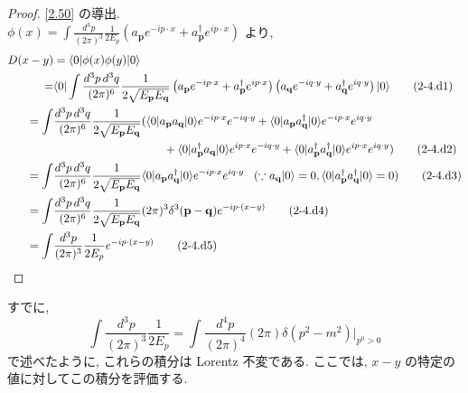 \documentclass[a4paper,12pt]{article}
\begin{document}
\color{blue}
\begin{proof}
\eqref{2.50} の導出.\\
$\displaystyle \phi(x) = \int \frac{d^3 p}{(2\pi)^3} \frac{1}{2E_p} \left( a_{\mathbf{p}} e^{-ip \cdot x} + a_{\mathbf{p}}^\dagger e^{ip \cdot x} \right)$ より,
\begin{align*}
  D(x-y) &= \langle 0 | \phi(x) \phi(y) | 0 \rangle \\
  =& \langle 0 | \int \frac{d^3 p\, d^3 q}{(2\pi)^6} \frac{1}{2\sqrt{E_{\mathbf{p}} E_{\mathbf{q}}}} \left( a_{\mathbf{p}} e^{-ip \cdot x} + a_{\mathbf{p}}^\dagger e^{ip \cdot x} \right) \left( a_{\mathbf{q}} e^{-iq \cdot y} + a_{\mathbf{q}}^\dagger e^{iq \cdot y} \right) | 0 \rangle \tag{2-4.d1}\\
  = \int& \frac{d^3 p\, d^3 q}{(2\pi)^6} \frac{1}{2\sqrt{E_{\mathbf{p}} E_{\mathbf{q}}}} (\langle 0 | a_{\mathbf{p}} a_{\mathbf{q}} | 0 \rangle e^{-ip \cdot x} e^{-iq \cdot y} + \langle 0 | a_{\mathbf{p}} a_{\mathbf{q}}^\dagger | 0 \rangle e^{-ip \cdot x} e^{iq \cdot y}\\
  &\quad \hspace{3cm} + \langle 0 | a_{\mathbf{p}}^\dagger a_{\mathbf{q}} | 0 \rangle e^{ip \cdot x} e^{-iq \cdot y} + \langle 0 | a_{\mathbf{p}}^\dagger a_{\mathbf{q}}^\dagger | 0 \rangle e^{ip \cdot x} e^{iq \cdot y}) \tag{2-4.d2}\\
  = \int& \frac{d^3 p\, d^3 q}{(2\pi)^6} \frac{1}{2\sqrt{E_{\mathbf{p}} E_{\mathbf{q}}}} \langle 0 | a_{\mathbf{p}} a_{\mathbf{q}}^\dagger | 0 \rangle e^{-ip \cdot x} e^{iq \cdot y} \hspace{0.3cm}(\because a_{\mathbf{q}} | 0 \rangle = 0, \langle 0 | a_{\mathbf{p}}^{\dagger} a_{\mathbf{q}}^{\dagger} | 0 \rangle = 0) \tag{2-4.d3}\\
  = \int& \frac{d^3 p\, d^3 q}{(2\pi)^6} \frac{1}{2\sqrt{E_{\mathbf{p}} E_{\mathbf{q}}}} (2\pi)^3 \delta^3(\mathbf{p} - \mathbf{q}) e^{-ip \cdot (x - y)} \tag{2-4.d4}\\
  = \int& \frac{d^3 p}{(2\pi)^3} \frac{1}{2E_p} e^{-ip \cdot (x - y)} \tag{2-4.d5}
\end{align*}

\end{proof}

\color{black}

すでに, 
\begin{equation*}
  \int \frac{d^3 p}{(2\pi)^3} \frac{1}{2E_p} = \int \frac{d^4 p}{(2\pi)^4} (2\pi) \delta(p^2 - m^2)\rvert_{p^0 > 0} \tag{2.40}
\end{equation*}
で述べたように, これらの積分は Lorentz 不変である. ここでは, $x - y$ の特定の値に対してこの積分を評価する.
\end{document}
